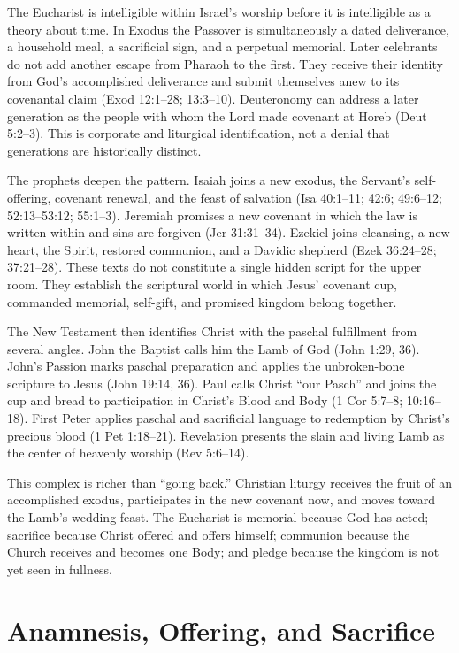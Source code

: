 \begin{deepstudy}
The Eucharist is intelligible within Israel's worship before it is intelligible
as a theory about time. In Exodus the Passover is simultaneously a dated
deliverance, a household meal, a sacrificial sign, and a perpetual memorial.
Later celebrants do not add another escape from Pharaoh to the first. They
receive their identity from God's accomplished deliverance and submit
themselves anew to its covenantal claim (Exod 12:1--28; 13:3--10). Deuteronomy
can address a later generation as the people with whom the Lord made covenant
at Horeb (Deut 5:2--3). This is corporate and liturgical identification, not a
denial that generations are historically distinct.

The prophets deepen the pattern. Isaiah joins a new exodus, the Servant's
self-offering, covenant renewal, and the feast of salvation (Isa 40:1--11;
42:6; 49:6--12; 52:13--53:12; 55:1--3). Jeremiah promises a new covenant in
which the law is written within and sins are forgiven (Jer 31:31--34).
Ezekiel joins cleansing, a new heart, the Spirit, restored communion, and a
Davidic shepherd (Ezek 36:24--28; 37:21--28). These texts do not constitute a
single hidden script for the upper room. They establish the scriptural world
in which Jesus' covenant cup, commanded memorial, self-gift, and promised
kingdom belong together.

The New Testament then identifies Christ with the paschal fulfillment from
several angles. John the Baptist calls him the Lamb of God (John 1:29, 36).
John's Passion marks paschal preparation and applies the unbroken-bone
scripture to Jesus (John 19:14, 36). Paul calls Christ ``our Pasch'' and joins
the cup and bread to participation in Christ's Blood and Body (1 Cor 5:7--8;
10:16--18). First Peter applies paschal and sacrificial language to redemption
by Christ's precious blood (1 Pet 1:18--21). Revelation presents the slain and
living Lamb as the center of heavenly worship (Rev 5:6--14).

This complex is richer than ``going back.'' Christian liturgy receives the
fruit of an accomplished exodus, participates in the new covenant now, and
moves toward the Lamb's wedding feast. The Eucharist is memorial because God
has acted; sacrifice because Christ offered and offers himself; communion
because the Church receives and becomes one Body; and pledge because the
kingdom is not yet seen in fullness.

\section{Anamnesis, Offering, and Sacrifice}


\end{deepstudy}
